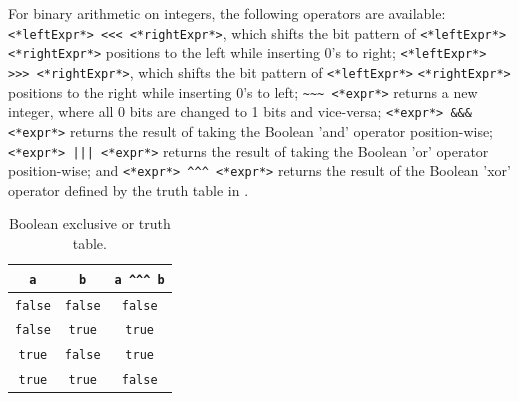 \documentclass[fsharpNotes.tex]{subfiles}
\begin{document}
For binary arithmetic on integers, the following operators are available:
\lstinline[language=syntax]{<*leftExpr*> <<< <*rightExpr*>}, which shifts the bit pattern of \lstinline[language=syntax]|<*leftExpr*>| \lstinline[language=syntax]|<*rightExpr*>| positions to the left while inserting 0's to right;
\lstinline[language=syntax]{<*leftExpr*> >>> <*rightExpr*>}, which shifts the bit pattern of \lstinline[language=syntax]|<*leftExpr*>| \lstinline[language=syntax]|<*rightExpr*>| positions to the right while inserting 0's to left; 
\lstinline[language=syntax]{~~~ <*expr*>} returns a new integer, where all 0 bits are changed to 1 bits and vice-versa;
\lstinline[language=syntax]{<*expr*> &&& <*expr*>} returns the result of taking the Boolean 'and' operator position-wise;
\lstinline[language=syntax]{<*expr*> ||| <*expr*>}  returns the result of taking the Boolean 'or' operator position-wise; and
\lstinline[language=syntax]{<*expr*> ^^^ <*expr*>} returns the result of the Boolean 'xor' operator defined by the truth table in .
\begin{table}
  \centering
  \begin{tabular}{|c|c|c|}
    \hline
    \rowcolor{headerRowColor} \lstinline!a! & \lstinline!b! & \lstinline!a ^^^ b!\\
    \hline
    \lstinline!false! & \lstinline!false! & \lstinline!false!\\
    \lstinline!false! & \lstinline!true! & \lstinline!true!\\
    \lstinline!true! & \lstinline!false! & \lstinline!true!\\
    \lstinline!true! & \lstinline!true! & \lstinline!false!\\
    \hline
  \end{tabular}
  \caption{Boolean exclusive or truth table.}
  \label{tab:xor}
\end{table}
%
\end{document}
